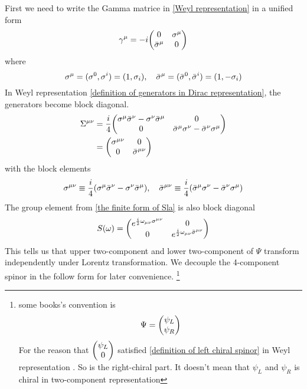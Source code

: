 First we need to write the Gamma matrice in \eqref{Weyl representation} in a unified form
\begin{equation} \label{unified form of gamma matrice}
\g^{\m} = -i\mqty( 0            & \s^{\m}\\
                   \bar{\s}^{\m}& 0     )
\end{equation}
where
\begin{equation}\label{definition of sigma matrice}
  \sigma^{\mu} = (\sigma^0,\sigma^i) = (1,\sigma_{i}),\quad
\bar{\sigma}^{\mu}=(\bar{\sigma}^0,\bar{\sigma}^i)=(1,-\sigma_{i})
\end{equation}
In Weyl representation \eqref{definition of generators in Dirac representation}, the generators become block diagonal.
\begin{align}\label{definition of generators in Weyl representation}
\Si^{\m\n}
&= \frac{i}{4}
\mqty(
\s^{\m}\bar{\s}^{\n}-\s^{\n}\bar{\s}^{\m}&
0\\
0&
\bar{\s}^{\m}\s^{\n}-\bar{\s}^{\n}\s^{\m}) \notag\\
& = \mqty(
\s^{\m\n}&
0\\
0&
\bar{\s}^{\m\n})
\end{align}
with the block elements
\begin{equation}
  \sigma^{\mu\nu}  \equiv \frac{i}{4}(\sigma^{\mu}\bar{\sigma}^{\nu}-\sigma^{\nu}\bar{\sigma}^{\mu}),\quad
\bar{\sigma}^{\mu\nu}
\equiv\frac{i}{4}(\bar{\sigma}^{\mu}\sigma^{\nu}-\bar{\sigma}^{\nu}\sigma^{\mu})
\end{equation}
The group element from \eqref{the finite form of Sla} is also block diagonal
\begin{equation} \label{group element for weyl representation}
S(\w) = \mqty(
e^{\frac{i}{2}\w_{\m\n}\s^{\m\n}} &
0                           \\
0                           &
e^{\frac{i}{2}\w_{\m\n}\bar{\s}^{\m\n}})
\end{equation}
This tells us that upper two-component and  lower two-component of $\Psi$  transform independently under Lorentz transformation. We decouple the 4-component spinor in the follow form for later convenience.
\footnote{
  some books's convention is
  \begin{equation*}
     \Psi = \mqty(\admat{\psi_L \\ \psi_R})
  \end{equation*}
  For the reason that $\mqty(\admat{\psi_L \\ 0})$ satisfied \eqref{definition of left chiral spinor} in Weyl representation . So is the right-chiral part. It doesn't mean that $\psi_L$ and $\psi_R$ is chiral in two-component representation
  }
